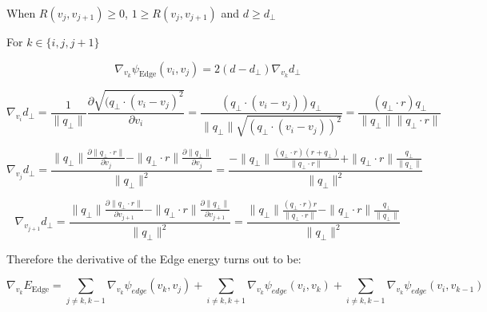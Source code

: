 When $R(v_j, v_{j+1})  \geq 0$,  $1\geq R(v_j, v_{j+1})$  and $d\geq d_{\perp}$

For $k \in \{i,j,j+1\} $



\begin{equation}
\nabla_{v_k} \psi_{\mathrm{Edge}} (v_i,v_j) = 2(d-d_{\perp})\nabla_{v_k} d_{\perp}
\end{equation}


\begin{equation}
\nabla_{v_i}d_{\perp} =
\frac{1}{\|q_{\perp}\|}\frac{\partial  \sqrt{(q_{\perp} \cdot (v_i-v_j)^2}}{\partial  v_i} =
\frac{(q_{\perp} \cdot (v_i-v_j))q_{\perp}}{\|q_{\perp}\|  \sqrt{(q_{\perp} \cdot (v_i-v_j))^2}} =\frac{(q_{\perp} \cdot r)q_\perp}{\|q_{\perp}\|\|q_{\perp} \cdot r\|}
\end{equation}



\begin{equation}
\nabla_{v_j}d_{\perp} = 
\frac{
	\|q_{\perp}\|\frac{
		\partial \|q_{\perp} \cdot r\|
	}{
	\partial v_{j}
}
-\|q_{\perp} \cdot r\|\frac{
	\partial \|q_{\perp} \|
}{
\partial v_{j}
}
}{
\|q_{\perp}\|^2
}
=
\frac{
	-\|q_{\perp}\|\frac{
		(q_{\perp} \cdot r)(r+q_{\perp})
	}{
	\|q_{\perp} \cdot r\|
}
+\|q_{\perp} \cdot r\|\frac{
	q_{\perp}
}{
\|q_{\perp} \|
}
}{
\|q_{\perp}\|^2
}
\end{equation}

\begin{equation}
\nabla_{v_{j+1}} d_{\perp}= 
\frac{
	\|q_{\perp}\|\frac{
		\partial \|q_{\perp} \cdot r\|
	}{
	\partial v_{j+1}
}
-\|q_{\perp} \cdot r\|\frac{
	\partial \|q_{\perp} \|
}{
\partial v_{j+1}
}
}{
\|q_{\perp}\|^2
}=
\frac{ 
	\|q_{\perp}\|\frac{
		(q_{\perp} \cdot r)r
	}{
	\|q_{\perp} \cdot r\|
}
-\|q_{\perp} \cdot r\|\frac{
	q_{\perp}
}{
\|q_{\perp} \|
}
}{
\|q_{\perp}\|^2
}
\end{equation}



Therefore the derivative of the Edge energy turns out to be:

\begin{equation}
\nabla_{v_k}E_{\mathrm{Edge}} 
=
\sum\limits_{j\neq k, k-1 } 
\nabla_{v_k}  \psi_{edge}(v_k,v_j) 
+
\sum\limits_{i\neq k, k+1 } 
\nabla_{v_k} \psi_{edge}(v_i,v_k) 
+
\sum\limits_{i\neq k, k-1 } 
\nabla_{v_k}  \psi_{edge}(v_i,v_{k-1}) 
\end{equation}


